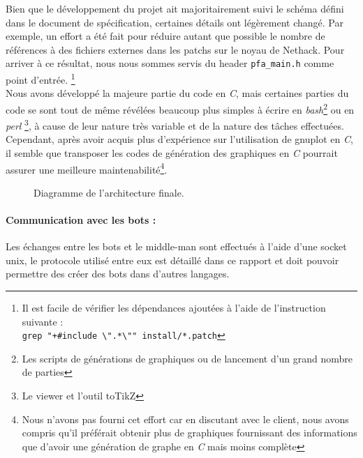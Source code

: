 \documentclass[a4paper,12pt]{article}
\begin{document}
Bien que le développement du projet ait majoritairement suivi le schéma
défini dans le document de spécification, certaines détails ont légèrement
changé. Par exemple, un effort a été fait pour réduire autant que possible
le nombre de références à des fichiers externes dans les patchs sur le noyau
de Nethack. Pour arriver à ce résultat, nous nous sommes servis du header
{\verb|pfa_main.h|} comme point d'entrée.
\footnote{Il est facile de vérifier les dépendances ajoutées à l'aide de
  l'instruction suivante :\\
{\verb*|grep "+#include \".*\"" install/*.patch|}}
\\
Nous avons développé la majeure partie du code en {\em C}, mais certaines
parties du code se sont tout de même révélées beaucoup plus simples à
écrire en {\em bash}\footnote{Les scripts de générations de graphiques ou de
  lancement d'un grand nombre de parties} ou en {\em perl}
\footnote{Le viewer et l'outil toTikZ}, à cause de leur nature très variable
et de la nature des tâches effectuées. Cependant, après avoir acquis plus
d'expérience sur l'utilisation de gnuplot en {\em C}, il semble que transposer
les codes de génération des graphiques en {\em C} pourrait assurer une
meilleure maintenabilité\footnote{Nous n'avons pas fourni cet effort car en
discutant avec le client, nous avons compris qu'il préférait obtenir plus de
graphiques fournissant des informations que d'avoir une génération de graphe
en {\em C} mais moins complète}.

\begin{figure}[H]
	\caption{\label{fig:architecture} Diagramme de l'architecture finale.}
\end{figure}

\paragraph{Communication avec les bots :}
Les échanges entre les bots et le middle-man sont effectués à l'aide d'une
socket unix, le protocole utilisé entre eux est détaillé dans ce rapport et doit
pouvoir permettre des créer des bots dans d'autres langages.
\end{document}

